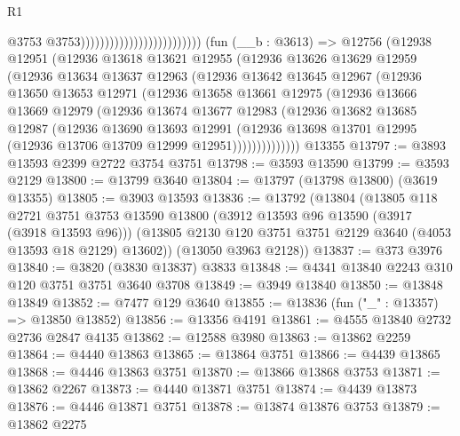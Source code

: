 \begin{lexlean}{R1}
\begin{coremodule}
                                                      @3753
                                                      @3753)))))))))))))))))))))))))
    (fun (__b : @3613) =>
    @12756
      (@12938
        @12951
        (@12936
          @13618
          @13621
          @12955
          (@12936
            @13626
            @13629
            @12959
            (@12936
              @13634
              @13637
              @12963
              (@12936
                @13642
                @13645
                @12967
                (@12936
                  @13650
                  @13653
                  @12971
                  (@12936
                    @13658
                    @13661
                    @12975
                    (@12936
                      @13666
                      @13669
                      @12979
                      (@12936
                        @13674
                        @13677
                        @12983
                        (@12936
                          @13682
                          @13685
                          @12987
                          (@12936
                            @13690
                            @13693
                            @12991
                            (@12936
                              @13698
                              @13701
                              @12995
                              (@12936 @13706 @13709 @12999 @12951))))))))))))))
    @13355
@13797 := @3893 @13593 @2399 @2722 @3754 @3751
@13798 := @3593 @13590
@13799 := @3593 @2129
@13800 := @13799 @3640
@13804 := @13797 (@13798 @13800) (@3619 @13355)
@13805 := @3903 @13593
@13836 := @13792
    (@13804
      (@13805
        @118
        @2721
        @3751
        @3753
        @13590
        @13800
        (@3912 @13593 @96 @13590 (@3917 (@3918 @13593 @96)))
        (@13805 @2130 @120 @3751 @3751 @2129 @3640 (@4053 @13593 @18 @2129) @13602))
      (@13050 @3963 @2128))
@13837 := @373 @3976
@13840 := @3820 (@3830 @13837) @3833
@13848 := @4341 @13840 @2243 @310 @120 @3751 @3751 @3640 @3708
@13849 := @3949 @13840
@13850 := @13848 @13849
@13852 := @7477 @129 @3640
@13855 := @13836 (fun ("_" : @13357) => @13850 @13852)
@13856 := @13356 @4191
@13861 := @4555 @13840 @2732 @2736 @2847 @4135
@13862 := @12588 @3980
@13863 := @13862 @2259
@13864 := @4440 @13863
@13865 := @13864 @3751
@13866 := @4439 @13865
@13868 := @4446 @13863 @3751
@13870 := @13866 @13868 @3753
@13871 := @13862 @2267
@13873 := @4440 @13871 @3751
@13874 := @4439 @13873
@13876 := @4446 @13871 @3751
@13878 := @13874 @13876 @3753
@13879 := @13862 @2275

\end{coremodule}
\end{lexlean}
